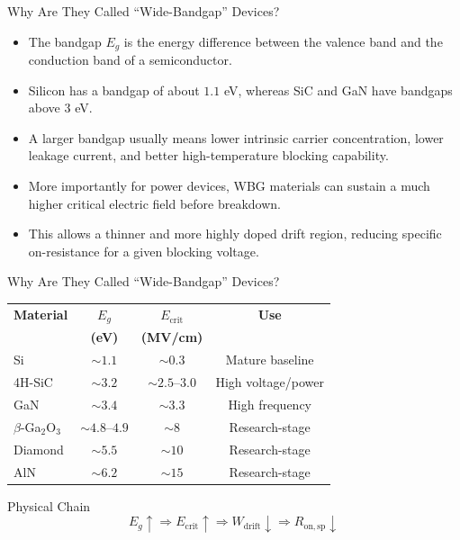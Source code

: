 \begin{frame}{Why Are They Called ``Wide-Bandgap'' Devices?}

\begin{itemize}
    \item The bandgap $E_g$ is the energy difference between the valence band and the conduction band of a semiconductor.
    \item Silicon has a bandgap of about $1.1$ eV, whereas SiC and GaN have bandgaps above $3$ eV.
    \item A larger bandgap usually means lower intrinsic carrier concentration, lower leakage current, and better high-temperature blocking capability.
    \item More importantly for power devices, WBG materials can sustain a much higher critical electric field before breakdown.
    \item This allows a thinner and more highly doped drift region, reducing specific on-resistance for a given blocking voltage.
\end{itemize}

\end{frame}


\begin{frame}{Why Are They Called ``Wide-Bandgap'' Devices?}
\begin{table}
\centering
\begin{tabular}{lccc}
\hline
\textbf{Material} & \textbf{$E_g$} & \textbf{$E_{\mathrm{crit}}$} & \textbf{Use} \\
 & \textbf{(eV)} & \textbf{(MV/cm)} &  \\
\hline
Si & $\sim 1.1$ & $\sim 0.3$ & Mature baseline \\
4H-SiC & $\sim 3.2$ & $\sim 2.5$--$3.0$ & High voltage/power \\
GaN & $\sim 3.4$ & $\sim 3.3$ & High frequency \\
$\beta$-Ga$_2$O$_3$ & $\sim 4.8$--$4.9$ & $\sim 8$ & Research-stage \\
Diamond & $\sim 5.5$ & $\sim 10$ & Research-stage \\
AlN & $\sim 6.2$ & $\sim 15$ & Research-stage \\
\hline
\end{tabular}
\end{table}

\begin{block}{Physical Chain}
\[
E_g \uparrow \Rightarrow E_{\mathrm{crit}} \uparrow
\Rightarrow W_{\mathrm{drift}} \downarrow
\Rightarrow R_{\mathrm{on,sp}} \downarrow
\]
\end{block}
\end{frame}


